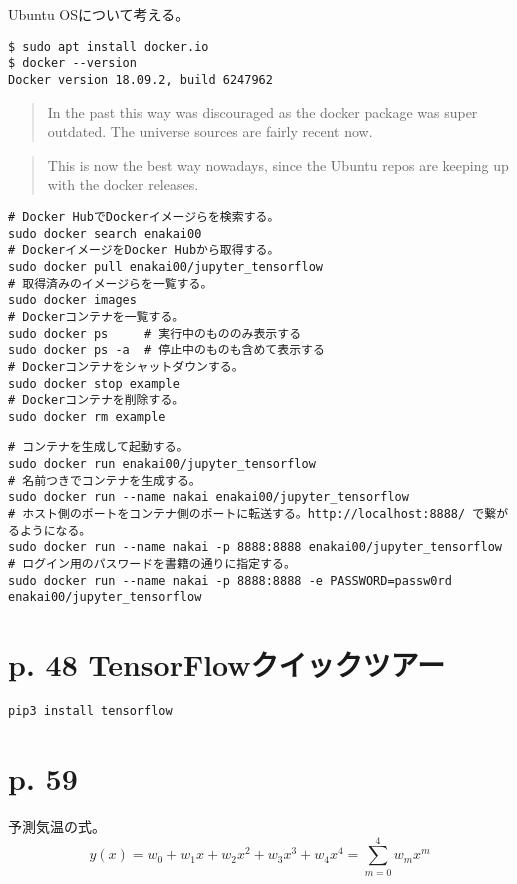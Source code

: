 \documentclass[uplatex,dvipdfmx]{jsarticle} \usepackage{amsmath,amssymb,bm}
\begin{document}
Ubuntu OSについて考える。

\begin{verbatim}
$ sudo apt install docker.io
$ docker --version
Docker version 18.09.2, build 6247962
\end{verbatim}

\begin{quotation}
In the past this way was discouraged as the docker package was super outdated. The universe sources are fairly recent now.
\end{quotation}

\begin{quotation}
This is now the best way nowadays, since the Ubuntu repos are keeping up with the docker releases.
\end{quotation}

\begin{verbatim}
# Docker HubでDockerイメージらを検索する。
sudo docker search enakai00
# DockerイメージをDocker Hubから取得する。
sudo docker pull enakai00/jupyter_tensorflow
# 取得済みのイメージらを一覧する。
sudo docker images
# Dockerコンテナを一覧する。
sudo docker ps     # 実行中のもののみ表示する
sudo docker ps -a  # 停止中のものも含めて表示する
# Dockerコンテナをシャットダウンする。
sudo docker stop example
# Dockerコンテナを削除する。
sudo docker rm example
\end{verbatim}

\begin{verbatim}
# コンテナを生成して起動する。
sudo docker run enakai00/jupyter_tensorflow
# 名前つきでコンテナを生成する。
sudo docker run --name nakai enakai00/jupyter_tensorflow
# ホスト側のポートをコンテナ側のポートに転送する。http://localhost:8888/ で繋がるようになる。
sudo docker run --name nakai -p 8888:8888 enakai00/jupyter_tensorflow
# ログイン用のパスワードを書籍の通りに指定する。
sudo docker run --name nakai -p 8888:8888 -e PASSWORD=passw0rd enakai00/jupyter_tensorflow
\end{verbatim}



\section*{p. 48 TensorFlowクイックツアー}
\begin{verbatim}
pip3 install tensorflow
\end{verbatim}



\section*{p. 59}
予測気温の式。
$$y(x)=w_0+w_1x+w_2x^2+w_3x^3+w_4x^4=\sum_{m=0}^4w_mx^m$$
\end{document}
